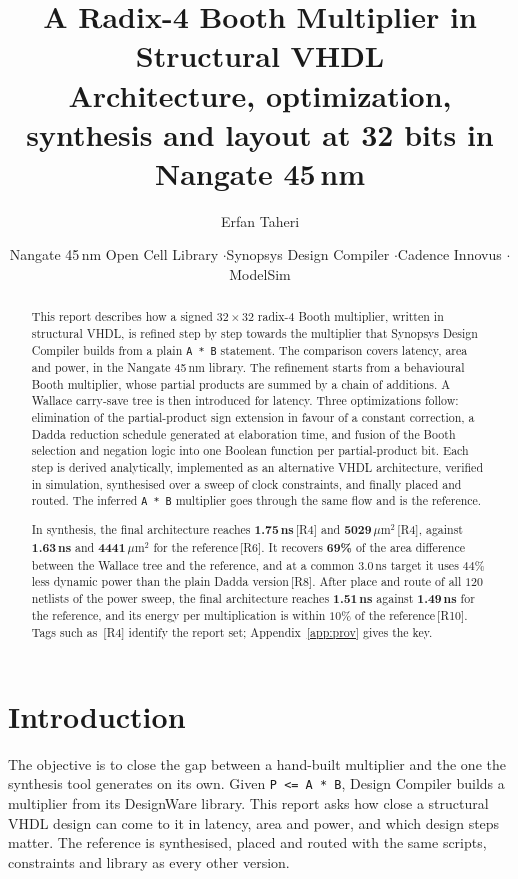 \documentclass[11pt,a4paper]{article}
\title{\textbf{A Radix-4 Booth Multiplier in Structural VHDL}\\[4pt]
       \large Architecture, optimization, synthesis and layout at 32 bits in Nangate 45\,nm}
\author{Erfan Taheri}
\date{Nangate 45\,nm Open Cell Library \quad$\cdot$\quad Synopsys Design Compiler \quad$\cdot$\quad Cadence Innovus \quad$\cdot$\quad ModelSim}
\newcommand{\umarea}{\ensuremath{\,\mu\mathrm{m}^{2}}}
\newcommand{\src}[1]{\,{\footnotesize\color{accent}[#1]}}
\begin{document}
\maketitle

\begin{abstract}
\noindent
This report describes how a signed $32\times32$ radix-4 Booth multiplier,
written in structural VHDL, is refined step by step towards the multiplier
that Synopsys Design Compiler builds from a plain \texttt{A * B} statement.
The comparison covers latency, area and power, in the Nangate 45\,nm library.
The refinement starts from a behavioural Booth multiplier, whose partial
products are summed by a chain of additions. A Wallace carry-save tree is
then introduced for latency. Three optimizations follow: elimination of the
partial-product sign extension in favour of a constant correction, a Dadda
reduction schedule generated at elaboration time, and fusion of the Booth
selection and negation logic into one Boolean function per partial-product
bit. Each step is derived analytically, implemented as an alternative VHDL
architecture, verified in simulation, synthesised over a sweep of clock
constraints, and finally placed and routed. The inferred \texttt{A * B}
multiplier goes through the same flow and is the reference.

In synthesis, the final architecture reaches \textbf{1.75\,ns}\src{R4} and
\textbf{5029\umarea}\src{R4}, against \textbf{1.63\,ns} and
\textbf{4441\umarea} for the reference\src{R6}. It recovers \textbf{69\%} of
the area difference between the Wallace tree and the reference, and at a
common $3.0$\,ns target it uses $44\%$ less dynamic power than the plain
Dadda version\src{R8}. After place and route of all $120$ netlists of the
power sweep, the final architecture reaches \textbf{1.51\,ns} against
\textbf{1.49\,ns} for the reference, and its energy per multiplication is
within $10\%$ of the reference\src{R10}. Tags such as \src{R4} identify the
report set; Appendix~\ref{app:prov} gives the key.
\end{abstract}

\tableofcontents
\clearpage

\section{Introduction}

The objective is to close the gap between a hand-built multiplier and the one
the synthesis tool generates on its own. Given \texttt{P <= A * B}, Design
Compiler builds a multiplier from its DesignWare library. This report asks how
close a structural VHDL design can come to it in latency, area and power, and
which design steps matter. The reference is synthesised, placed and routed
with the same scripts, constraints and library as every other version.
\end{document}
